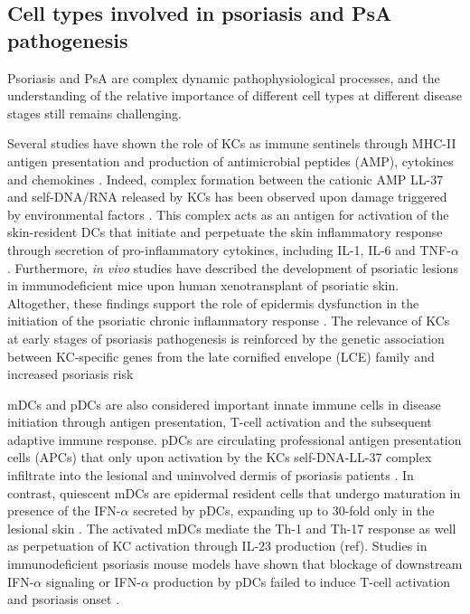 

\subsection{Cell types involved in psoriasis and PsA pathogenesis}

Psoriasis and PsA are complex dynamic pathophysiological processes, and the understanding of the relative importance of different cell types at different disease stages still remains challenging.

Several studies have shown the role of KCs as immune sentinels through MHC-II antigen presentation and production of antimicrobial peptides (AMP), cytokines and chemokines \parencite{Black2007}. Indeed, complex formation between the cationic AMP LL-37 and self-DNA/RNA released by KCs has been observed upon damage triggered by environmental factors \parencite{Lande2007}. This complex acts as an antigen for activation of the skin-resident DCs that initiate and perpetuate the skin inflammatory response through secretion of pro-inflammatory cytokines, including IL-1, IL-6 and TNF-$\alpha$ \parencite{Feldmeyer2007, Arend2008, Nestle2009, Nestle2005}. Furthermore, \textit{in vivo} studies have described the development of psoriatic lesions in immunodeficient mice upon human xenotransplant of psoriatic skin\parencite{Boyman2004}. Altogether, these findings support the role of epidermis dysfunction in the initiation of the psoriatic chronic inflammatory response \parencite{Proskch2008}.  The relevance of KCs at early stages of psoriasis pathogenesis is reinforced by the genetic association between KC-specific genes from the late cornified envelope (LCE) family and increased psoriasis risk \parencite{Tsoi2012}

mDCs and pDCs are also considered important innate immune cells in disease initiation through antigen presentation, T-cell activation and the subsequent adaptive immune response\parencite{Mahil20016}. pDCs are circulating professional antigen presentation cells (APCs) that only upon activation by the KCs self-DNA-LL-37 complex infiltrate into the lesional and uninvolved dermis of psoriasis patients \parencite{Nestle2005, Lande2007}. In contrast, quiescent mDCs are epidermal resident cells that undergo maturation in presence of the IFN-$\alpha$ secreted by pDCs, expanding up to 30-fold only in the lesional skin \parencite{Zaba2007}. The activated mDCs mediate the Th-1 and Th-17 response as well as perpetuation of KC activation through IL-23 production (ref). Studies in immunodeficient psoriasis mouse models have shown that blockage of downstream IFN-$\alpha$ signaling or IFN-$\alpha$ production by pDCs failed to induce T-cell activation and psoriasis onset \parencite{Nestle2005}. 


